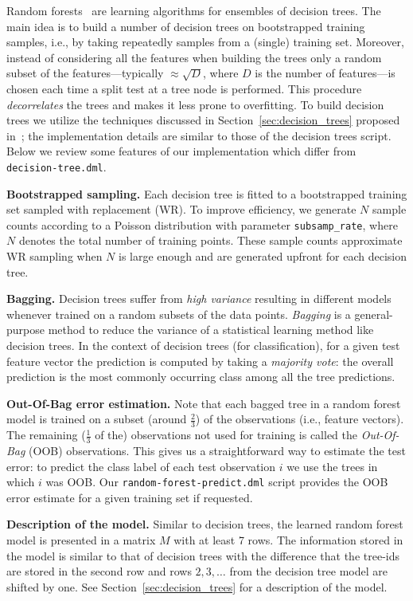 Random forests~\cite{Breiman01:rforest} are learning algorithms for ensembles of decision trees. 
The main idea is to build a number of decision trees on bootstrapped training samples, i.e., by taking repeatedly samples from a (single) training set. 
Moreover, instead of considering all the features when building the trees only a random subset of the features---typically $\approx \sqrt{D}$, where $D$ is the number of features---is chosen each time a split test at a tree node is performed. 
This procedure {\it decorrelates} the trees and makes it less prone to overfitting. 
To build decision trees we utilize the techniques discussed in Section~\ref{sec:decision_trees} proposed in~\cite{PandaHBB09:dtree}; 
the implementation details are similar to those of the decision trees script.
Below we review some features of our implementation which differ from {\tt decision-tree.dml}.


\textbf{Bootstrapped sampling.} 
Each decision tree is fitted to a bootstrapped training set sampled with replacement (WR).  
To improve efficiency, we generate $N$ sample counts according to a Poisson distribution with parameter {\tt subsamp\_rate},
where $N$ denotes the total number of training points.
These sample counts approximate WR sampling when $N$ is large enough and are generated upfront for each decision tree.


\textbf{Bagging.}
Decision trees suffer from {\it high variance} resulting in different models whenever trained on a random subsets of the data points.  
{\it Bagging} is a general-purpose method to reduce the variance of a statistical learning method like decision trees.
In the context of decision trees (for classification), for a given test feature vector 
the prediction is computed by taking a {\it majority vote}: the overall prediction is the most commonly occurring class among all the tree predictions.

 
\textbf{Out-Of-Bag error estimation.} 
Note that each bagged tree in a random forest model is trained on a subset (around $\frac{2}{3}$) of the observations (i.e., feature vectors).
The remaining ($\frac{1}{3}$ of the) observations not used for training is called the {\it Out-Of-Bag} (OOB) observations. 
This gives us a straightforward way to estimate the test error: to predict the class label of each test observation $i$ we use the trees in which $i$ was OOB.
Our {\tt random-forest-predict.dml} script provides the OOB error estimate for a given training set if requested.  


\textbf{Description of the model.} 
Similar to decision trees, the learned random forest model is presented in a matrix $M$  with at least 7 rows.
The information stored in the model is similar to that of decision trees with the difference that the tree-ids are stored
in the second row and rows $2,3,\ldots$ from the decision tree model are shifted by one. See Section~\ref{sec:decision_trees} for a description of the model.


